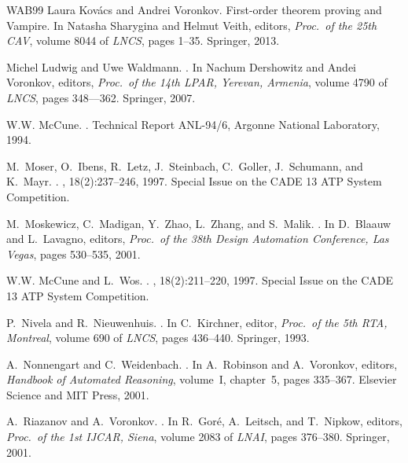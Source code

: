 \documentclass{report}
\begin{document}
\begin{thebibliography}{WAB{\etalchar{+}}99}
Laura Kov{\'a}cs and Andrei Voronkov.
\newblock First-order theorem proving and {Vampire}.
\newblock In Natasha Sharygina and Helmut Veith, editors, {\em Proc.\ of the
  25th CAV}, volume 8044 of {\em LNCS}, pages 1--35. Springer, 2013.

Michel Ludwig and Uwe Waldmann.
.
\newblock In Nachum Dershowitz and Andei Voronkov, editors, {\em Proc.\ of the
  14th LPAR, Yerevan, Armenia}, volume 4790 of {\em LNCS}, pages 348–--362.
  Springer, 2007.

W.W. McCune.
.
\newblock Technical Report ANL-94/6, Argonne National Laboratory, 1994.

M.~Moser, O.~Ibens, R.~Letz, J.~Steinbach, C.~Goller, J.~Schumann, and K.~Mayr.
.
, 18(2):237--246, 1997.
\newblock Special Issue on the CADE 13 ATP System Competition.

M.~Moskewicz, C.~Madigan, Y.~Zhao, L.~Zhang, and S.~Malik.
.
\newblock In D.~Blaauw and L.~Lavagno, editors, {\em Proc.\ of the 38th Design
  Automation Conference, Las Vegas}, pages 530--535, 2001.

W.W. McCune and L.~Wos.
.
, 18(2):211--220, 1997.
\newblock Special Issue on the CADE 13 ATP System Competition.

P.~Nivela and R.~Nieuwenhuis.
.
\newblock In C.~Kirchner, editor, {\em Proc.\ of the 5th RTA, Montreal}, volume
  690 of {\em LNCS}, pages 436--440. Springer, 1993.

A.~Nonnengart and C.~Weidenbach.
.
\newblock In A.~Robinson and A.~Voronkov, editors, {\em Handbook of Automated
  Reasoning}, volume~I, chapter~5, pages 335--367. Elsevier Science and MIT
  Press, 2001.

A.~Riazanov and A.~Voronkov.
.
\newblock In R.~Gor{\'e}, A.~Leitsch, and T.~Nipkow, editors, {\em Proc.\ of
  the 1st IJCAR, Siena}, volume 2083 of {\em LNAI}, pages 376--380. Springer,
  2001.


\end{thebibliography}
\end{document}
